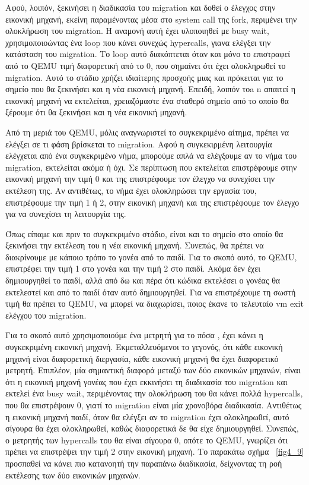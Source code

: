 Αφού, λοιπόν, ξεκινήσει η διαδικασία του migration και δοθεί ο έλεγχος στην
εικονική μηχανή, εκείνη παραμένοντας μέσα στο system call της fork, περιμένει
την ολοκλήρωση του migration. Η αναμονή αυτή έχει υλοποιηθεί με busy wait,
χρησιμοποιοώντας ένα loop που κάνει συνεχώς hypercalls, γιανα ελέγξει την
κατάσταση του migration. Το loop αυτό διακόπτεται όταν και μόνο το επιστραφεί
από το QEMU τιμή διαφορετική από το 0, που σημαίνει ότι έχει ολοκληρωθεί το
migration. Αυτό το στάδιο χρήζει ιδιαίτερης προσχοής μιας και πρόκειται για το
σημείο που θα ξεκινήσει και η νέα εικονική μηχανή. Επειδή, λοιπόν τοa
n απαιτεί η εικονική μηχανή να εκτελείται, χρειαζόμαστε ένα σταθερό σημείο από
το οποίο θα ξέρουμε ότι θα ξεκινήσει και η νέα εικονική μηχανή.

Από τη μεριά του QEMU, μόλις αναγνωριστεί το συγκεκριμένο αίτημα, πρέπει να
ελέγξει σε τι φάση βρίσκεται το migration. Αφού η συγκεκιρμένη λειτουργία
ελέγχεται από ένα συγκεκριμένο νήμα, μπορούμε απλά να ελέγξουμε αν το νήμα του
migration, εκτελείται ακόμα ή όχι. Σε περίπτωση που εκτελείται επιστρέφουμε στην
εικονική μηχανή την τιμή 0 και της επιστρέφουμε τον έλεγχο να συνεχίσει την
εκτέλεση της. Αν αντιθέτως, το νήμα έχει ολοκληρώσει την εργασία του,
επιστρέφουμε την τιμή 1 ή 2, στην εικονική μηχανή και της επιστρέφουμε τον
έλεγχο για να συνεχίσει τη λειτουργία της. 

Όπως είπαμε και πριν το συγκεκριμένο στάδιο, είναι και το σημείο στο οποίο θα
ξεκινήσει την εκτέλεση του η νέα εικονική μηχανή. Συνεπώς, θα πρέπει να
διακρίνουμε με κάποιο τρόπο το γονέα από το παιδί. Για το σκοπό αυτό, το QEMU,
επιστρέφει την τιμή 1 στο γονέα και την τιμή 2 στο παιδί. Ακόμα δεν έχει
δημιουργηθεί το παιδί, αλλά από δω και πέρα ότι κώδικα εκτελέσει ο γονέας θα
εκτελεστεί και από το παιδί όταν αυτό δημιουργηθεί. Για να επιστρέχουμε τη σωστή
τιμή θα πρέπει το QEMU, να μπορεί να διαχωρίσει, ποιος έκανε το τελευταίο vm
exit ελέγχου του migration. 

Για το σκοπό αυτό χρησιμοποιούμε ένα μετρητή για το πόσα , έχει κάνει
η συγκεκριμένη εικονική μηχανή. Εκμεταλλευόμενοι το γεγονός, ότι κάθε εικονική
μηχανή είναι διαφορετική διεργασία, κάθε εικονική μηχανή θα έχει διαφορετικό
μετρητή. Επιπλέον, μία σημαντική διαφορά μεταξύ των δύο εικονικών μηχανών, είναι
ότι η εικονική μηχανή γονέας που έχει εκκινήσει τη διαδικασία του migration και
εκτελεί ένα busy wait, περιμένοντας την ολοκλήρωση του θα κάνει πολλά
hypercalls, που θα επιστρέψουν 0, γιατί το migration είναι μία χρονοβόρα
διαδικασία. Αντιθέτως η εικονική μηχανή παιδί, όταν θα ελέγξει αν το migration
έχει ολοκληρωθεί, αυτό σίγουρα θα έχει ολοκληρωθεί, καθώς διαφορετικά δε θα είχε
δημιουργηθεί. Συνεπώς, ο μετρητής των hypercalls του θα είναι σίγουρα 0, οπότε
το QEMU, γνωρίζει ότι πρέπει να επιστρέψει την τιμή 2 στην εικονική μηχανή. Το
παρακάτω σχήμα ~\ref{fig4_9} προσπαθεί να κάνει πιο κατανοητή την παραπάνω
διαδικασία, δείχνοντας τη ροή εκτέλεσης των δύο εικονικών μηχανών.  

